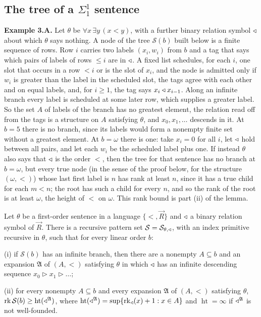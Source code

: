 \documentclass[11pt]{article}
\begin{document}
\subsection{The tree of a $\Sigma^1_1$ sentence}

\textbf{Example 3.A.} Let $\theta$ be $\forall x\, \exists y\, (x < y)$, with a further binary relation symbol
$\triangleleft$ about which $\theta$ says nothing. A node of the tree $\mathcal S(b)$ built below is a finite sequence of
rows. Row $i$ carries two labels $(x_i, w_i)$ from $b$ and a tag that says which pairs of labels of rows $\le i$
are in $\triangleleft$. A fixed list schedules, for each $i$, one slot that occurs in a row $< i$ or is the slot of $x_i$,
and the node is admitted only if $w_i$ is greater than the label in the scheduled slot, the tags agree with each
other and on equal labels, and, for $i \ge 1$, the tag says $x_i \triangleleft x_{i-1}$. Along an infinite branch every label is scheduled at some later row, which supplies a greater
label. So the set $A$ of labels of the branch has no greatest element, the relation read off from the tags is a
structure on $A$ satisfying $\theta$, and $x_0, x_1, \dots$ descends in it. At $b = 5$ there is no branch, since its
labels would form a nonempty finite set without a greatest element. At $b = \omega$ there is one: take $x_i = 0$
for all $i$, let $\triangleleft$ hold between all pairs, and let each $w_i$ be the scheduled label plus one. If instead
$\theta$ also says that $\triangleleft$ is the order $<$, then the tree for that sentence has no branch at $b = \omega$, but
every true node (in the sense of the proof below, for the structure $(\omega, <)$) whose last first label is $n$
has rank at least $n$, since it has a true child for each $m < n$; the root has such a child for every $n$, and so
the rank of the root is at least $\omega$, the height of $<$ on $\omega$. This rank bound is part (ii) of the
lemma.

\begin{statement} Let $\theta$ be a first-order sentence in a language $\{<, \vec R\}$ and $\triangleleft$ a
binary relation symbol of $\vec R$. There is a recursive pattern set $\mathcal S = \mathcal S_{\theta, \triangleleft}$, with an
index primitive recursive in $\theta$, such that for every linear order $b$:

(i) if $\mathcal S(b)$ has an infinite branch, then there are a nonempty $A \subseteq b$ and an expansion
$\mathfrak A$ of $(A, <)$ satisfying $\theta$ in which $\triangleleft$ has an infinite descending sequence
$x_0 \mathrel{\triangleright} x_1 \mathrel{\triangleright} \dots$;

(ii) for every nonempty $A \subseteq b$ and every expansion $\mathfrak A$ of $(A, <)$ satisfying $\theta$,
$\operatorname{rk} \mathcal S(b) \ge \operatorname{ht}(\triangleleft^{\mathfrak A})$, where
$\operatorname{ht}(\triangleleft^{\mathfrak A}) = \sup\{\operatorname{rk}_{\triangleleft}(x) + 1 : x \in A\}$ and
$\operatorname{ht} = \infty$ if $\triangleleft^{\mathfrak A}$ is not well-founded.
\end{statement}
\end{document}
